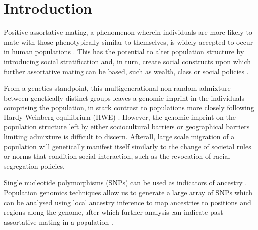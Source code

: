 \documentclass[11pt]{article}
\begin{document}
\section{Introduction}





Positive assortative mating, a phenomenon wherein individuals are more likely to mate with those phenotypically similar to themselves, is widely accepted to occur in human populations \parencite{Norris2019}. This has the potential to alter population structure by introducing social stratification and, in turn, create social constructs upon which further assortative mating can be based, such as wealth, class or social policies \parencite{Risch2009}.

From a genetics standpoint, this multigenerational non-random admixture between genetically distinct groups leaves a genomic imprint in the individuals comprising the population, in stark contrast to populations more closely following Hardy-Weinberg equilibrium (HWE) \parencite{Zaitlen2017}. However, the genomic imprint on the population structure left by either sociocultural barriers or geographical barriers limiting admixture is difficult to discern. Afterall, large scale migration of a population will genetically manifest itself similarly to the change of societal rules or norms that condition social interaction, such as the revocation of racial segregation policies. 

Single nucleotide polymorphisms (SNPs) can be used as indicators of ancestry \parencite{Risch2009}. Population genomics techniques allow us to generate a large array of SNPs which can be analysed using local ancestry inference to map ancestries to positions and regions along the genome, after which further analysis can indicate past assortative mating in a population \parencite{Schubert2020}.
\end{document}

